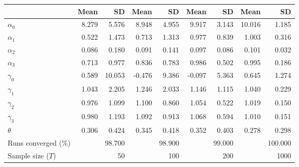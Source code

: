 
\begin{tabular}[t]{lrrrrrrrr}
\toprule
  & Mean & SD & Mean  & SD  & Mean   & SD   & Mean    & SD   \\
\midrule
$\alpha_{0}$ & 8.279 & 5.576 & 8.948 & 4.955 & 9.917 & 3.143 & 10.016 & 1.185\\
$\alpha_{1}$ & 0.522 & 1.473 & 0.713 & 1.313 & 0.977 & 0.839 & 1.003 & 0.316\\
$\alpha_{2}$ & 0.086 & 0.180 & 0.091 & 0.141 & 0.097 & 0.086 & 0.101 & 0.032\\
$\alpha_{3}$ & 0.713 & 0.977 & 0.836 & 0.783 & 0.986 & 0.502 & 0.995 & 0.186\\
$\gamma_{0}$ & 0.589 & 10.053 & -0.476 & 9.386 & -0.097 & 5.363 & 0.645 & 1.274\\
$\gamma_{1}$ & 1.043 & 2.205 & 1.246 & 2.033 & 1.146 & 1.115 & 1.040 & 0.229\\
$\gamma_{2}$ & 0.976 & 1.099 & 1.100 & 0.860 & 1.054 & 0.522 & 1.019 & 0.150\\
$\gamma_{3}$ & 0.980 & 1.193 & 1.092 & 0.913 & 1.068 & 0.594 & 1.010 & 0.151\\
$\theta$ & 0.306 & 0.424 & 0.345 & 0.418 & 0.352 & 0.403 & 0.278 & 0.298\\
Runs converged (\%) &  & 98.700 &  & 98.900 &  & 99.000 &  & 100.000\\
Sample size ($T$) &  & 50 &  & 100 &  & 200 &  & 1000\\
\bottomrule
\end{tabular}
